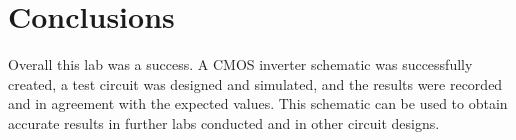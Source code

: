 \documentclass[12pt]{article}
\begin{document}
\section{Conclusions}
Overall this lab was a success. A CMOS inverter schematic was successfully created, a test circuit was designed and simulated, and the results were recorded and in agreement with the expected values. This schematic can be used to obtain accurate results in further labs conducted and in other circuit designs.
\end{document}
